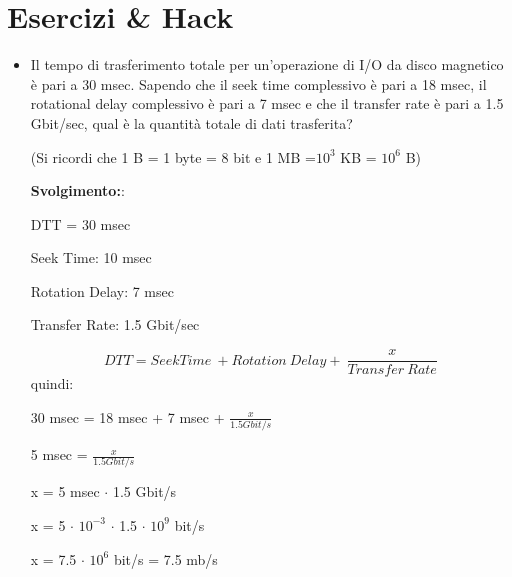 \documentclass{article}
\begin{document}
\section{Esercizi \& Hack}
\begin{itemize}
    \item Il tempo di trasferimento totale per un'operazione di I/O da disco magnetico è pari a 30 msec. Sapendo che il seek time complessivo è pari a 18 msec, il rotational delay complessivo è pari a 7 msec e che il transfer rate è pari a 1.5 Gbit/sec, qual è la quantità totale di dati trasferita? \par(Si ricordi che 1 B = 1 byte = 8 bit e 1 MB =$10^{3}$ KB = $10^{6}$ B)\par
    \textbf{Svolgimento:}:\par
    DTT = 30 msec\par
    Seek Time: 10 msec\par
    Rotation Delay: 7 msec\par
    Transfer Rate: 1.5 Gbit/sec\par
    \begin{equation}
        DTT = Seek Time\ + Rotation\ Delay +\ \frac{x}{Transfer\ Rate}
    \end{equation}
    quindi:\par
    \begin{center}
        30 msec = 18 msec + 7 msec + $\frac{x}{1.5 Gbit/s}$\par
        5 msec = $\frac{x}{1.5 Gbit/s}$\par
        x = 5 msec $\cdot$ 1.5 Gbit/s\par
        x = 5 $\cdot$ $10^{-3}$ $\cdot$ 1.5 $\cdot$ $10^{9}$ bit/s\par
        x = 7.5 $\cdot$ $10^{6}$ bit/s = 7.5 mb/s
    \end{center}


\end{itemize}
\end{document}
